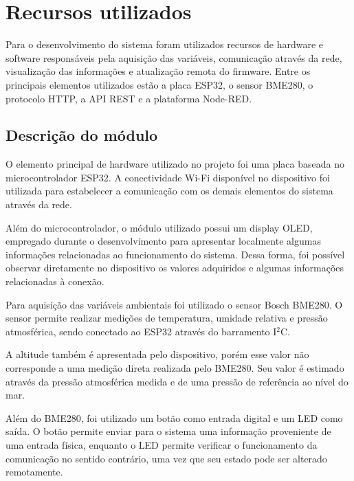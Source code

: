 \vspace{5mm}
\section{Recursos utilizados}
\label{sec:recursos}

Para o desenvolvimento do sistema foram utilizados recursos de hardware e software responsáveis pela aquisição das variáveis, comunicação através da rede, visualização das informações e atualização remota do firmware. Entre os principais elementos utilizados estão a placa ESP32, o sensor BME280, o protocolo HTTP, a API REST e a plataforma Node-RED.
\vspace{3mm}
\subsection{Descrição do módulo}

O elemento principal de hardware utilizado no projeto foi uma placa baseada no microcontrolador ESP32. A conectividade Wi-Fi disponível no dispositivo foi utilizada para estabelecer a comunicação com os demais elementos do sistema através da rede.

Além do microcontrolador, o módulo utilizado possui um display OLED, empregado durante o desenvolvimento para apresentar localmente algumas informações relacionadas ao funcionamento do sistema. Dessa forma, foi possível observar diretamente no dispositivo os valores adquiridos e algumas informações relacionadas à conexão.

Para aquisição das variáveis ambientais foi utilizado o sensor Bosch BME280. O sensor permite realizar medições de temperatura, umidade relativa e pressão atmosférica, sendo conectado ao ESP32 através do barramento I$^2$C.

A altitude também é apresentada pelo dispositivo, porém esse valor não corresponde a uma medição direta realizada pelo BME280. Seu valor é estimado através da pressão atmosférica medida e de uma pressão de referência ao nível do mar.

Além do BME280, foi utilizado um botão como entrada digital e um LED como saída. O botão permite enviar para o sistema uma informação proveniente de uma entrada física, enquanto o LED permite verificar o funcionamento da comunicação no sentido contrário, uma vez que seu estado pode ser alterado remotamente.

